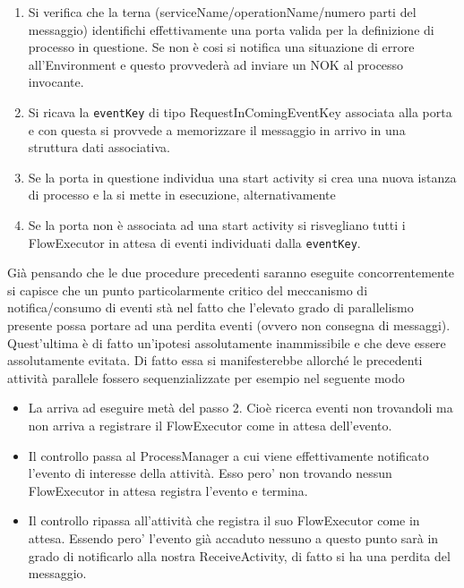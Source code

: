\begin{enumerate}
  \item Si verifica che la terna (serviceName/operationName/numero parti del
  messaggio) identifichi effettivamente una porta valida per la definizione 
  di processo in questione. Se non \`e cosi si notifica una
  situazione di errore all'Environment e questo provvederà ad inviare un NOK al
  processo invocante.
 
 \item Si ricava la \texttt{eventKey} di tipo RequestInComingEventKey associata
 alla porta e con questa si provvede a memorizzare il messaggio in arrivo in 
 una struttura dati associativa.
 
 \item Se la porta in questione individua una start activity si crea una nuova
 istanza di processo e la si mette in esecuzione, alternativamente 
 
 \item Se la porta non \`e associata ad una start activity si risvegliano tutti
 i FlowExecutor in attesa di eventi individuati dalla \texttt{eventKey}.
\end{enumerate}

Già pensando che le due procedure precedenti saranno eseguite concorrentemente
si capisce che un punto particolarmente critico del meccanismo di
notifica/consumo di eventi stà nel fatto che l'elevato grado di parallelismo
presente possa portare ad una perdita eventi (ovvero non consegna di messaggi).
Quest'ultima \`e di fatto un'ipotesi assolutamente inammissibile e che deve
essere assolutamente evitata. Di fatto essa si manifesterebbe allorché le precedenti
attività parallele fossero sequenzializzate per esempio nel seguente modo

\begin{itemize}
  \item La  arriva ad eseguire metà del passo 2. Cioè
  ricerca eventi non trovandoli ma non arriva a registrare il FlowExecutor come
  in attesa dell'evento.
  \item Il controllo passa al ProcessManager a cui viene effettivamente
  notificato l'evento di interesse della attività. Esso pero' non trovando
  nessun FlowExecutor in attesa registra l'evento e termina.
  \item Il controllo ripassa all'attività che registra il suo FlowExecutor come
  in attesa. Essendo pero' l'evento già accaduto nessuno a questo punto sarà
  in grado di notificarlo alla nostra ReceiveActivity, di fatto si ha una
  perdita del messaggio.
\end{itemize}

